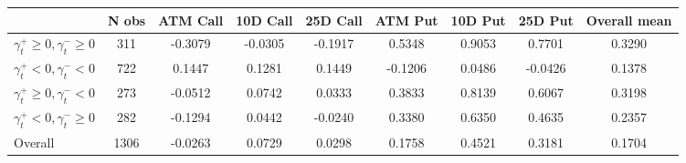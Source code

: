 \begin{tabular}{
  l *{8}{S}
}
\toprule
{} &  {N obs} &  {ATM Call} &  {10D Call} &  {25D Call} &  {ATM Put} &  {10D Put} &  {25D Put} &  {Overall mean} \\
\midrule
${\gamma^+_t} \geq 0, {\gamma^-_t} \geq 0$    &    311 &         -0.3079 &         -0.0305 &         -0.1917 &         0.5348 &         0.9053 &         0.7701 &        0.3290 \\
${\gamma^+_t} < 0, {\gamma^-_t} < 0$ &    722 &          0.1447 &          0.1281 &          0.1449 &        -0.1206 &         0.0486 &        -0.0426 &        0.1378 \\
${\gamma^+_t} \geq 0, {\gamma^-_t} < 0$   &    273 &         -0.0512 &          0.0742 &          0.0333 &         0.3833 &         0.8139 &         0.6067 &        0.3198 \\
${\gamma^+_t} < 0, {\gamma^-_t} \geq 0$ &    282 &         -0.1294 &          0.0442 &         -0.0240 &         0.3380 &         0.6350 &         0.4635 &        0.2357 \\
{Overall}  &   1306 &         -0.0263 &          0.0729 &          0.0298 &         0.1758 &         0.4521 &         0.3181 &        0.1704 \\
\bottomrule
\end{tabular}
